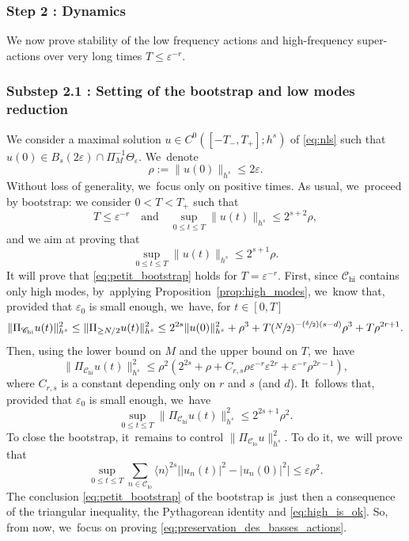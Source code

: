 \documentclass[10pt,a4paper]{amsart}
\newcommand{\Psfrac}[2]{(\sfrac{#1}{#2})}
\theoremstyle{plain}
\theoremstyle{definition}
\DeclareMathOperator{\hi}{hi}
\DeclareMathOperator{\lo}{lo}
\newcommand{\1}{\mathbf{1}}
\newcommand{\Clo}{\mathscr{C}_{\lo}}
\newcommand{\Chigh}{\mathscr{C}_{\hi}}
\let\epsilon\varepsilon
\begin{document}
\subsubsection*{Step 2 : Dynamics}
We now prove stability of the low frequency actions and high-frequency super-actions over very long times $T\leq \epsilon^{-r}$.

\subsubsection*{Substep 2.1 : Setting of the bootstrap and low modes reduction}
We consider a maximal solution $u\in C^0([-T_-,T_+];h^s)$ of \eqref{eq:nls} such that $u(0) \in B_s(2\varepsilon) \cap \Pi_M^{-1}\Theta_\varepsilon$. We~denote
\[
\rho := \|u(0) \|_{h^s} \leq 2\varepsilon.
\]
Without loss of generality, we~focus only on positive times. As usual, we~proceed by bootstrap: we consider $0<T<T_+$ such that
\[
T\leq \varepsilon^{-r} \quad \mathrm{and} \quad \sup_{0\leq t \leq T} \| u(t) \|_{h^s} \leq 2^{s+2} \rho,
\]
and we aim at proving that
\begin{equation}
\label{eq:petit_bootstrap}
\sup_{0\leq t \leq T} \| u(t) \|_{h^s} \leq 2^{s+1} \rho.
\end{equation}
It will prove that \eqref{eq:petit_bootstrap} holds for $T=\varepsilon^{-r}$. First, since $\Chigh$ contains only high modes, by~applying Proposition~\ref{prop:high_modes}, we~know that, provided that $\varepsilon_0$ is small enough, we~have, for $t\in [0,T]$
\[
\| \Pi_{\Chigh} u(t) \|_{h^s}^2 \leq \| \Pi_{\geq N/2} u(t) \|_{h^s}^2 \leq 2^{2s} \| u(0) \|_{h^s}^2 + \rho^3 + T(\sfrac{N}2)^{-\Psfrac{\delta}{2}(s-d)} \rho^{3}+T \rho^{2r+1}.
\]
Then, using the lower bound on $M$ and the upper bound on $T$, we~have
\[
\| \Pi_{\Chigh} u(t) \|_{h^s}^2 \leq \rho^2 (2^{2s} + \rho + C_{r,s}\rho \varepsilon^{-r} \varepsilon^{2r}+ \varepsilon^{-r} \rho^{2r-1}),
\]
where $C_{r,s}$ is a constant depending only on $r$ and $s$ (and $d$). It~follows that, provided that $\varepsilon_0$ is small enough, we~have
\begin{equation}
\label{eq:high_is_ok}
\sup_{0\leq t \leq T} \| \Pi_{\Chigh} u(t) \|_{h^s}^2 \leq 2^{2s+1} \rho^2.
\end{equation}
To close the bootstrap, it~remains to control $ \| \Pi_{\Clo} u \|_{h^s}^2$. To do it, we~will prove that
\begin{equation}
\label{eq:preservation_des_basses_actions}
\sup_{0\leq t \leq T} \sum_{n\in \Clo} \langle n\rangle^{2s} \big| |u_n(t)|^2 - |u_n(0)|^2 \big|\leq \varepsilon \rho^2.
\end{equation}
The conclusion \eqref{eq:petit_bootstrap} of the bootstrap is~just then a consequence of the triangular inequality, the Pythagorean identity and \eqref{eq:high_is_ok}. So, from now, we~focus on proving \eqref{eq:preservation_des_basses_actions}.
\end{document}
